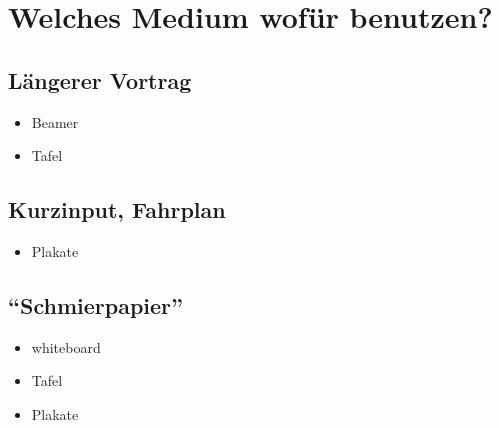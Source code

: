 \section{Welches Medium wofür benutzen?}

\subsection{Längerer Vortrag}
\begin{itemize}
  \item Beamer
  \item Tafel
\end{itemize}

\subsection{Kurzinput, Fahrplan}
\begin{itemize}
  \item Plakate
\end{itemize}

\subsection{"`Schmierpapier"'}
\begin{itemize}
  \item whiteboard
  \item Tafel
  \item Plakate
\end{itemize}
